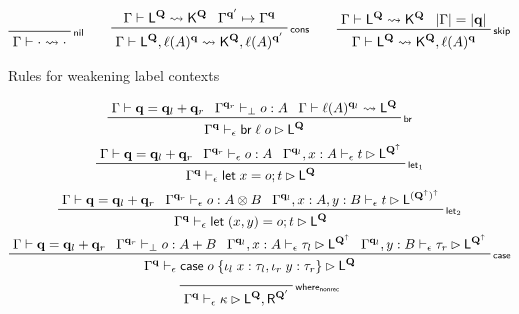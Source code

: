 \documentclass[acmsmall,screen,review]{acmart}
\newcommand{\mb}[1]{\ensuremath{\mathbf{#1}}}
\newcommand{\ms}[1]{\ensuremath{\mathsf{#1}}}
\newcommand{\lto}{:}
\newcommand{\linl}[1]{\iota_l\;{#1}}
\newcommand{\linr}[1]{\iota_r\;{#1}}
\newcommand{\letstmt}[3]{\ensuremath{\ms{let}\;#1 = #2; #3}}
\newcommand{\brb}[2]{\ms{br}\;#1\;#2}
\newcommand{\casestmt}[5]{\ms{case}\;#1\;\{\linl{#2} \lto #3, \linr{#4} \lto #5\}}
\newcommand{\qsp}[4]{#1 \vdash #2 = #3 + #4}
\newcommand{\cwk}[2]{#1 \mapsto #2}
\newcommand{\lwk}[3]{#1 \vdash #2 \rightsquigarrow #3}
\newcommand{\lhyp}[2]{#1(#2)}
\newcommand{\rle}[1]{{\scriptsize\textsf{#1}}}
\newcommand{\hasty}[4]{#1 \vdash_{#2} #3: {#4}}
\newcommand{\haslb}[4]{#1 \vdash_{#2} #3 \rhd #4}
\newcommand{\zeroqv}[1]{#1^\uparrow}
\begin{document}
\begin{figure}
\begin{gather*}
  \prftree[r]{\rle{nil}}{\lwk{\Gamma}{\cdot}{\cdot}} \qquad 
  \prftree[r]{\rle{cons}}
    {\lwk{\Gamma}{\ms{L}^{\mb{Q}}}{\ms{K}^{\mb{Q}}}}
    {\cwk{\Gamma^{\mb{q}'}}{\Gamma^{\mb{q}}}}
    {\lwk{\Gamma}{\ms{L}^{\mb{Q}}, \lhyp{\ell}{A}^{\mb{q}}}
    {\ms{K}^{\mb{Q}}, \lhyp{\ell}{A}^{\mb{q}'}}} \qquad
  \prftree[r]{\rle{skip}}
    {\lwk{\Gamma}{\ms{L}^{\mb{Q}}}{\ms{K}^{\mb{Q}}}}
    {|\Gamma| = |\mb{q}|}
    {\lwk{\Gamma}{\ms{L}^{\mb{Q}}}{\ms{K}^{\mb{Q}}, \lhyp{\ell}{A}^{\mb{q}}}}
\end{gather*}
\caption{Rules for weakening label contexts}
\Description{}
\label{fig:label-wk}
\end{figure}


\begin{figure}
  \begin{gather*}
    \prftree[r]{\rle{br}}
      {\qsp{\Gamma}{\mb{q}}{\mb{q}_l}{\mb{q}_r}}
      {\hasty{\Gamma^{\mb{q}_r}}{\bot}{o}{A}}
      {\lwk{\Gamma}{\lhyp{\ell}{A}^{\mb{q}_l}}{\ms{L}^{\mb{Q}}}}
      {\haslb{\Gamma^{\mb{q}}}{\epsilon}{\brb{\ell}{o}}{\ms{L}^{\mb{Q}}}}
    \\
    \prftree[r]{\rle{let$_1$}}
      {\qsp{\Gamma}{\mb{q}}{\mb{q}_l}{\mb{q}_r}}
      {\hasty{\Gamma^{\mb{q}_r}}{\epsilon}{o}{A}}
      {\haslb{\Gamma^{\mb{q}_l}, x : A}{\epsilon}{t}{\ms{L}^{\zeroqv{\mb{Q}}}}}
      {\haslb{\Gamma^{\mb{q}}}{\epsilon}{\letstmt{x}{o}{t}}{\ms{L}^{\mb{Q}}}}
    \\
    \prftree[r]{\rle{let$_2$}}
      {\qsp{\Gamma}{\mb{q}}{\mb{q}_l}{\mb{q}_r}}
      {\hasty{\Gamma^{\mb{q}_r}}{\epsilon}{o}{A \otimes B}}
      {\haslb{\Gamma^{\mb{q}_l}, x : A, y : B}{\epsilon}{t}
        {\ms{L}^{\zeroqv{(\zeroqv{\mb{Q}})}}}}
      {\haslb{\Gamma^{\mb{q}}}{\epsilon}{\letstmt{(x, y)}{o}{t}}{\ms{L}^{\mb{Q}}}}
    \\
    \prftree[r]{\rle{case}}
      {\qsp{\Gamma}{\mb{q}}{\mb{q}_l}{\mb{q}_r}}
      {\hasty{\Gamma^{\mb{q}_r}}{\bot}{o}{A + B}}
      {\haslb{\Gamma^{\mb{q}_l}, x : A}{\epsilon}{\tau_l}
        {\ms{L}^{\zeroqv{\mb{Q}}}}}
      {\haslb{\Gamma^{\mb{q}_l}, y : B}{\epsilon}{\tau_r}
        {\ms{L}^{\zeroqv{\mb{Q}}}}}
      {\haslb{\Gamma^{\mb{q}}}{\epsilon}{\casestmt{o}{x}{\tau_l}{y}{\tau_r}}
                                                {\ms{L}^{\mb{Q}}}}
    \\
    \prftree[r]{\rle{where$_{\ms{nonrec}}$}}
      {\haslb{\Gamma^{\mb{q}}}{\epsilon}{\kappa}
        {\ms{L}^{\mb{Q}}, \ms{R}^{\mb{Q}'}}}

\end{gather*}
\end{figure}
\end{document}
